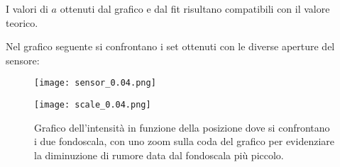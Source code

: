 \documentclass[../main.tex]{subfiles}
\begin{document}
I valori di $a$ ottenuti dal grafico e dal fit risultano compatibili con il valore teorico.

Nel grafico seguente si confrontano i set ottenuti con le diverse aperture del sensore:

\begin{figure}[ht!]
    \centering
    \texttt{[image: sensor\_0.04.png]}
    \caption{}
    \label{fig:sensore 0.04}
\end{figure}

\begin{figure}[ht!]
    \centering
    \texttt{[image: scale\_0.04.png]}
    \caption{Grafico dell'intensità in funzione della posizione dove si confrontano i due fondoscala, con uno zoom sulla coda del grafico per evidenziare la diminuzione di rumore data dal fondoscala più piccolo.}
\end{figure}
\end{document}
